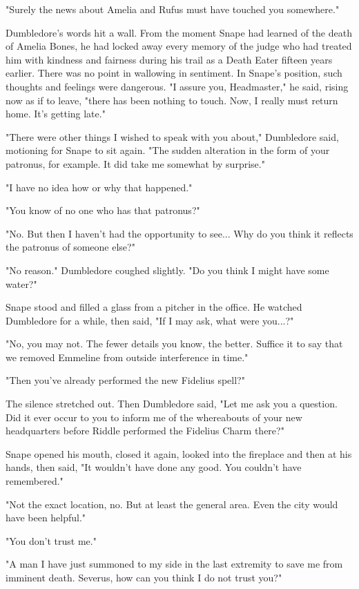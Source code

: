 \documentclass[a4paper,11pt]{article}
\begin{document}
"Surely the news about Amelia and Rufus must have touched you somewhere."

Dumbledore's words hit a wall. From the moment Snape had learned of the death of Amelia Bones, he had locked away every memory of the judge who had treated him with kindness and fairness during his trail as a Death Eater fifteen years earlier. There was no point in wallowing in sentiment. In Snape's position, such thoughts and feelings were dangerous. "I assure you, Headmaster," he said, rising now as if to leave, "there has been nothing to touch. Now, I really must return home. It's getting late."

"There were other things I wished to speak with you about," Dumbledore said, motioning for Snape to sit again. "The sudden alteration in the form of your patronus, for example. It did take me somewhat by surprise."

"I have no idea how or why that happened."

"You know of no one who has that patronus?"

"No. But then I haven't had the opportunity to see... Why do you think it reflects the patronus of someone else?"

"No reason." Dumbledore coughed slightly. "Do you think I might have some water?"

Snape stood and filled a glass from a pitcher in the office. He watched Dumbledore for a while, then said, "If I may ask, what were you...?"

"No, you may not. The fewer details you know, the better. Suffice it to say that we removed Emmeline from outside interference in time."

"Then you've already performed the new Fidelius spell?"

The silence stretched out. Then Dumbledore said, "Let me ask you a question. Did it ever occur to you to inform me of the whereabouts of your new headquarters before Riddle performed the Fidelius Charm there?"

Snape opened his mouth, closed it again, looked into the fireplace and then at his hands, then said, "It wouldn't have done any good. You couldn't have remembered."

"Not the exact location, no. But at least the general area. Even the city would have been helpful."

"You don't trust me."

"A man I have just summoned to my side in the last extremity to save me from imminent death. Severus, how can you think I do not trust you?"
\end{document}
